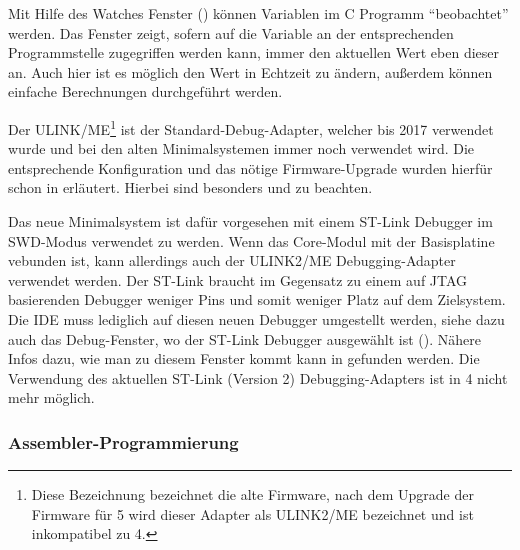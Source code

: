 
Mit Hilfe des Watches Fenster () können Variablen im \gls{C} Programm \enquote{beobachtet} werden. Das Fenster zeigt, sofern auf die Variable an der entsprechenden Programmstelle zugegriffen werden kann, immer den aktuellen Wert eben dieser an. Auch hier ist es möglich den Wert in Echtzeit zu ändern, außerdem können einfache Berechnungen durchgeführt werden.

\label{sec:tut-debugging1}

Der ULINK/ME\footnote{Diese Bezeichnung bezeichnet die alte Firmware, nach dem Upgrade der Firmware für \uVision{} 5 wird dieser Adapter als ULINK2/ME bezeichnet und ist inkompatibel zu \uVision{} 4.} ist der Standard-Debug-Adapter, welcher bis 2017 verwendet wurde und bei den alten \gls{Minimalsystem}en immer noch verwendet wird. Die entsprechende Konfiguration und das nötige Firmware-Upgrade wurden hierfür schon in  erläutert. Hierbei sind besonders  und  zu beachten.

\label{sec:tut-debugging2}

Das neue \gls{Minimalsystem} ist dafür vorgesehen mit einem ST-Link Debugger im \gls{SWD}-Modus verwendet zu werden. Wenn das \gls{Core-Modul} mit der \gls{Basisplatine} vebunden ist, kann allerdings auch der ULINK2/ME \gls{Debugging}-Adapter verwendet werden. Der ST-Link braucht im Gegensatz zu einem auf \gls{JTAG} basierenden Debugger weniger Pins und somit weniger Platz auf dem Zielsystem. Die \gls{IDE} muss lediglich auf diesen neuen Debugger umgestellt werden, siehe dazu auch das Debug-Fenster, wo der ST-Link Debugger ausgewählt ist (). Nähere Infos dazu, wie man zu diesem Fenster kommt kann in  gefunden werden. Die Verwendung des aktuellen ST-Link (Version 2) \gls{Debugging}-Adapters ist in \uVision{} 4 nicht mehr möglich.


\subsubsection{Assembler-Programmierung}
\label{sec:tut-asm}

